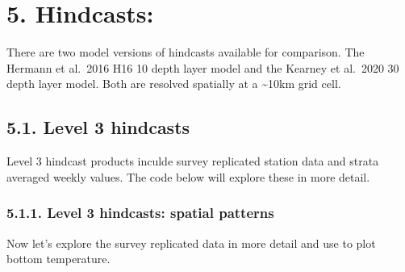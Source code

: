 \documentclass[
]{article}
\begin{document}
\hypertarget{hindcasts}{%
\section{5. Hindcasts:}\label{hindcasts}}

There are two model versions of hindcasts available for comparison. The
Hermann et al.~2016 H16 10 depth layer model and the Kearney et al.~2020
30 depth layer model. Both are resolved spatially at a
\textasciitilde10km grid cell.

\hypertarget{level-3-hindcasts}{%
\subsection{5.1. Level 3 hindcasts}\label{level-3-hindcasts}}

Level 3 hindcast products inculde survey replicated station data and
strata averaged weekly values. The code below will explore these in more
detail.

\hypertarget{level-3-hindcasts-spatial-patterns}{%
\subsubsection{5.1.1. Level 3 hindcasts: spatial
patterns}\label{level-3-hindcasts-spatial-patterns}}

Now let's explore the survey replicated data in more detail and use to
plot bottom temperature.
\end{document}

